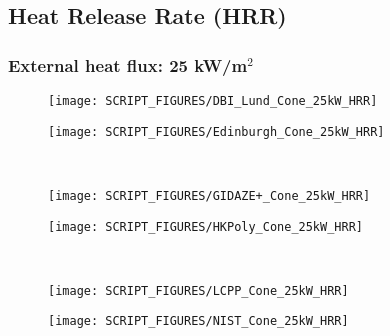 \subsection{Heat Release Rate (HRR)}
\label{Cone_HRR}
\subsubsection{External heat flux: 25 kW/m$^2$}
\begin{minipage}{0.5\textwidth}
\begin{figure}[H]
{\texttt{[image: SCRIPT\_FIGURES/DBI\_Lund\_Cone\_25kW\_HRR]}}\\
\end{figure}
\end{minipage}
\begin{minipage}{0.35\textwidth}
\begin{figure}[H]
{\texttt{[image: SCRIPT\_FIGURES/Edinburgh\_Cone\_25kW\_HRR]}}\\
\end{figure}
\end{minipage}\\
\begin{minipage}{0.5\textwidth}
\begin{figure}[H]
{\texttt{[image: SCRIPT\_FIGURES/GIDAZE+\_Cone\_25kW\_HRR]}}\\
\end{figure}
\end{minipage}
\begin{minipage}{0.35\textwidth}
\begin{figure}[H]
{\texttt{[image: SCRIPT\_FIGURES/HKPoly\_Cone\_25kW\_HRR]}}\\
\end{figure}
\end{minipage}\\
\begin{minipage}{0.5\textwidth}
\begin{figure}[H]
{\texttt{[image: SCRIPT\_FIGURES/LCPP\_Cone\_25kW\_HRR]}}\\
\end{figure}
\end{minipage}
\begin{minipage}{0.35\textwidth}
\begin{figure}[H]
{\texttt{[image: SCRIPT\_FIGURES/NIST\_Cone\_25kW\_HRR]}}\\
\end{figure}
\end{minipage}
